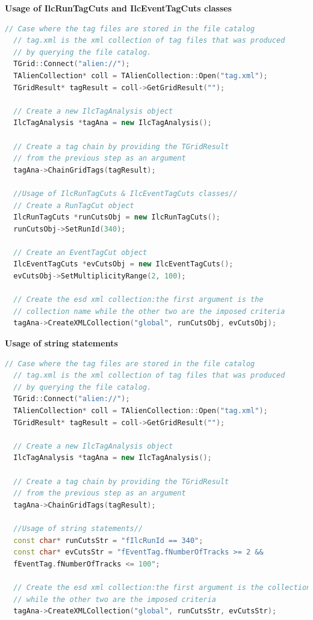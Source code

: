 \vspace{0.5 cm}
\textbf{Usage of IlcRunTagCuts and IlcEventTagCuts classes}
\begin{lstlisting}[language=C++]
  // Case where the tag files are stored in the file catalog
  // tag.xml is the xml collection of tag files that was produced 
  // by querying the file catalog.
  TGrid::Connect("alien://"); 
  TAlienCollection* coll = TAlienCollection::Open("tag.xml");
  TGridResult* tagResult = coll->GetGridResult("");
  
  // Create a new IlcTagAnalysis object
  IlcTagAnalysis *tagAna = new IlcTagAnalysis(); 

  // Create a tag chain by providing the TGridResult
  // from the previous step as an argument
  tagAna->ChainGridTags(tagResult);

  //Usage of IlcRunTagCuts & IlcEventTagCuts classes//
  // Create a RunTagCut object
  IlcRunTagCuts *runCutsObj = new IlcRunTagCuts();
  runCutsObj->SetRunId(340);

  // Create an EventTagCut object
  IlcEventTagCuts *evCutsObj = new IlcEventTagCuts();
  evCutsObj->SetMultiplicityRange(2, 100);

  // Create the esd xml collection:the first argument is the 
  // collection name while the other two are the imposed criteria
  tagAna->CreateXMLCollection("global", runCutsObj, evCutsObj);
\end{lstlisting}


\vspace{0.5 cm}
\textbf{Usage of string statements}
\begin{lstlisting}[language=C++]
  // Case where the tag files are stored in the file catalog
  // tag.xml is the xml collection of tag files that was produced 
  // by querying the file catalog.
  TGrid::Connect("alien://"); 
  TAlienCollection* coll = TAlienCollection::Open("tag.xml");
  TGridResult* tagResult = coll->GetGridResult("");
  
  // Create a new IlcTagAnalysis object
  IlcTagAnalysis *tagAna = new IlcTagAnalysis(); 

  // Create a tag chain by providing the TGridResult
  // from the previous step as an argument
  tagAna->ChainGridTags(tagResult);

  //Usage of string statements//
  const char* runCutsStr = "fIlcRunId == 340";
  const char* evCutsStr = "fEventTag.fNumberOfTracks >= 2 &&
  fEventTag.fNumberOfTracks <= 100";

  // Create the esd xml collection:the first argument is the collection name 
  // while the other two are the imposed criteria 
  tagAna->CreateXMLCollection("global", runCutsStr, evCutsStr);
\end{lstlisting}

